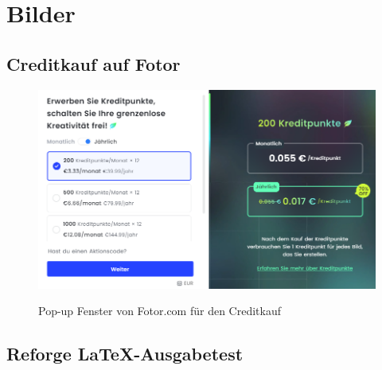 \appendix
\chapter{Bilder}
\section{Creditkauf auf Fotor}

\begin{figure}[H]
\centering
\includegraphics[width=1\linewidth]{Images/Creditkauf auf Fotor.png}\\
\caption{Pop-up Fenster von Fotor.com für den Creditkauf}
\label{fig:Fotor_Credits}
\end{figure}

\section{Reforge LaTeX-Ausgabetest}

